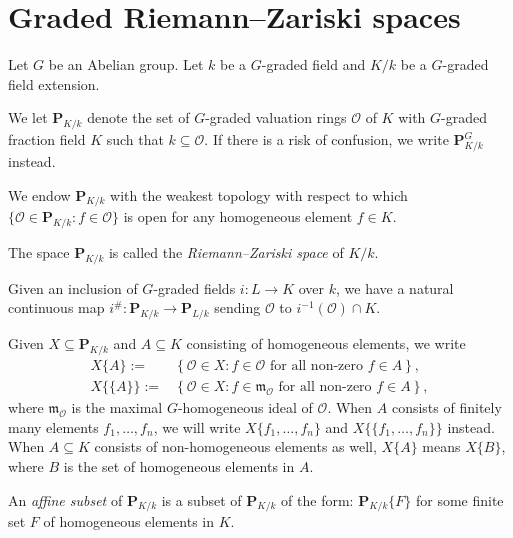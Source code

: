 \section{Graded Riemann--Zariski spaces}
Let $G$ be an Abelian group.
Let $k$ be a $G$-graded field and $K/k$ be a $G$-graded field extension.
\begin{definition}
    We let $\mathbf{P}_{K/k}$ denote the set of $G$-graded valuation rings $\mathcal{O}$ of $K$ with $G$-graded fraction field $K$ such that $k\subseteq \mathcal{O}$.
    If there is a risk of confusion, we write $\mathbf{P}_{K/k}^G$ instead.

    We endow $\mathbf{P}_{K/k}$ with the weakest topology with respect to which $\{\mathcal{O}\in \mathbf{P}_{K/k}:f\in \mathcal{O}\}$ is open for any homogeneous element $f\in K$.

    The space $\mathbf{P}_{K/k}$ is called the \emph{Riemann--Zariski space} of $K/k$.

    Given an inclusion of $G$-graded fields $i:L\rightarrow K$ over $k$, we have a natural continuous map $i^{\#}:\mathbf{P}_{K/k}\rightarrow \mathbf{P}_{L/k}$ sending $\mathcal{O}$ to $i^{-1}(\mathcal{O})\cap K$.
\end{definition}
Given $X\subseteq \mathbf{P}_{K/k}$ and $A\subseteq K$ consisting of homogeneous elements, we write 
\[
    \begin{aligned}
        X\{A\}:=&\left\{\mathcal{O}\in X:f\in \mathcal{O} \text{ for all non-zero }f\in A \right\},\\
        X\{\{A\}\}:=&\left\{ \mathcal{O}\in X: f\in \mathfrak{m}_{\mathcal{O}} \text{ for all non-zero }f\in A \right\},
    \end{aligned}  
\]
where $\mathfrak{m}_{\mathcal{O}}$ is the maximal $G$-homogeneous ideal of $\mathcal{O}$. When $A$ consists of finitely many elements $f_1,\ldots,f_n$, we will write $X\{f_1,\ldots,f_n\}$ and $X\{\{f_1,\ldots,f_n\}\}$ instead. When $A\subseteq K$ consists of non-homogeneous elements as well, $X\{A\}$ means $X\{B\}$, where $B$ is the set of homogeneous elements in $A$.

\begin{definition}
    An \emph{affine subset} of $\mathbf{P}_{K/k}$ is a subset of $\mathbf{P}_{K/k}$ of the form: $\mathbf{P}_{K/k}\{F\}$ for some finite set $F$ of homogeneous elements in $K$.
\end{definition}

